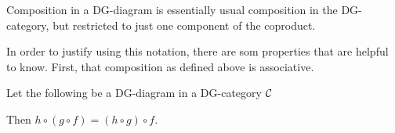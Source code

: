 Composition in a DG-diagram is essentially usual composition in the DG-category, but restricted to just one component of the coproduct.

In order to justify using this notation, there are som properties that are helpful to know. First, that composition as defined above is associative.

\begin{lemma}
    \label{lem:dg-composition_associative}
    Let the following be a DG-diagram in a DG-category \( {\mathcal{C}} \)
    \begin{center}
    \end{center}

    Then \( h \circ (g \circ f) = (h \circ g) \circ f \).
\end{lemma}
